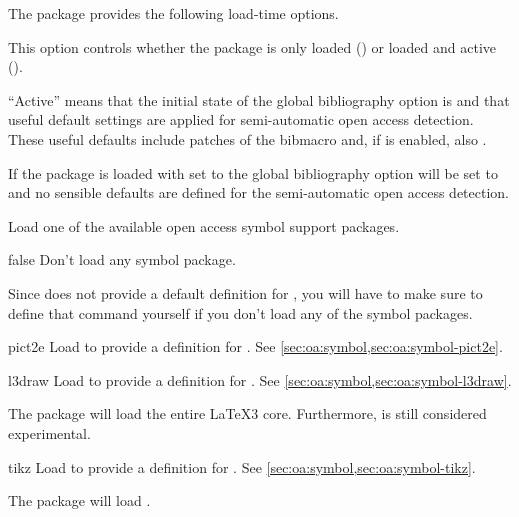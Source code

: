 \documentclass[DIV=9]{scrartcl}
\begin{document}
The package  provides the following load-time options.
\begin{optionlist}

This option controls whether the package is only loaded () or
loaded and active ().

\enquote{Active} means that the initial state of the global bibliography option
 is  and that useful default settings are
applied for semi-automatic open access detection.
These useful defaults include patches of the bibmacro 
and, if  is enabled, also .

If the package is loaded with  set to  the global
bibliography option  will be set to  and no
sensible defaults are defined for the semi-automatic open access detection.


Load one of the available open access symbol support packages.
\begin{valuelist}
  \item[false] Don't load any symbol package.
    \begin{warnbox}
      Since  does not provide a default definition for
      , you will have to make sure to define that command
      yourself if you don't load any of the symbol packages.
    \end{warnbox}
  \item[pict2e] Load  to provide a
    definition for .
    See \cref{sec:oa:symbol,sec:oa:symbol-pict2e}.
  \item[l3draw] Load  to provide a
    definition for .
    See \cref{sec:oa:symbol,sec:oa:symbol-l3draw}.
    \begin{remindbox}
      The package  will load the entire
      \LaTeX3 core.
      Furthermore,  is still considered experimental.
    \end{remindbox}
  \item[tikz] Load  to provide a
    definition for .
    See \cref{sec:oa:symbol,sec:oa:symbol-tikz}.
    \begin{remindbox}
      The package  will load \pgftikz.
    \end{remindbox}
\end{valuelist}


\end{optionlist}
\end{document}

